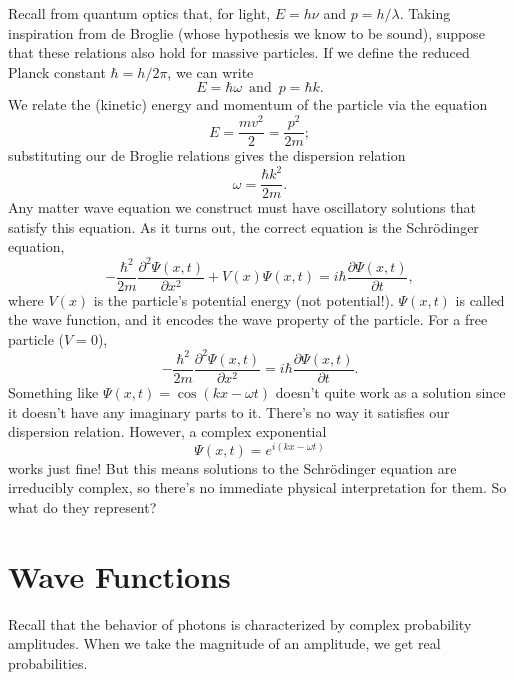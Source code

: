 \documentclass[../p052main.tex]{subfiles}
\begin{document}
Recall from quantum optics that, for light, $E = h\nu$ and $p = h / \lambda$.
Taking inspiration from de Broglie (whose hypothesis we know to be sound), suppose that these relations also hold for massive particles.
If we define the reduced Planck constant $\hbar = h / 2\pi$, we can write
\[ E = \hbar \omega \,\text{ and }\, p = \hbar k. \]
We relate the (kinetic) energy and momentum of the particle via the equation
\[ E = \frac{mv^2}{2} = \frac{p^2}{2m}; \]
substituting our de Broglie relations gives the dispersion relation
\[ \omega = \frac{\hbar k^2}{2m}. \]
Any matter wave equation we construct must have oscillatory solutions that satisfy this equation.
As it turns out, the correct equation is the Schrödinger equation,
\[ -\frac{\hbar^2}{2m} \frac{\partial^2 \Psi(x,t)}{\partial x^2} + V(x) \Psi(x,t) = i \hbar \frac{\partial \Psi(x,t)}{\partial t}, \]
where $V(x)$ is the particle's potential energy (not potential!).
$\Psi(x,t)$ is called the wave function, and it encodes the wave property of the particle.
For a free particle ($V = 0$),
\[ -\frac{\hbar^2}{2m} \frac{\partial^2 \Psi(x,t)}{\partial x^2} = i \hbar \frac{\partial \Psi(x,t)}{\partial t}. \]
Something like $\Psi(x,t) = \cos (kx - \omega t)$ doesn't quite work as a solution since it doesn't have any imaginary parts to it.
There's no way it satisfies our dispersion relation.
However, a complex exponential
\[ \Psi(x,t) = e^{i(kx - \omega t)} \]
works just fine!
But this means solutions to the Schrödinger equation are irreducibly complex, so there's no immediate physical interpretation for them.
So what do they represent?


\section{Wave Functions}
Recall that the behavior of photons is characterized by complex probability amplitudes.
When we take the magnitude of an amplitude, we get real probabilities.
\end{document}
